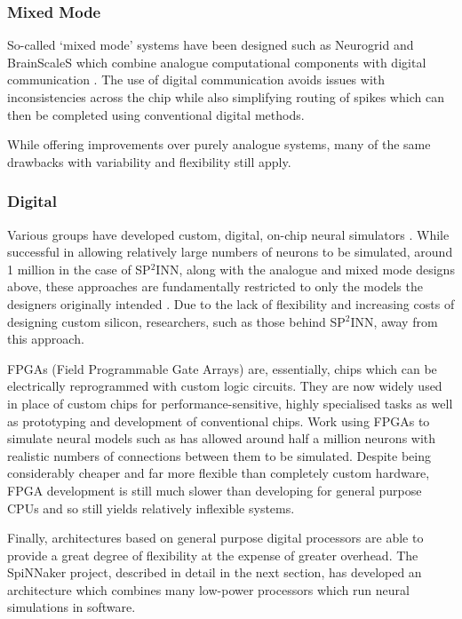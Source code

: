 			\subsubsection{Mixed Mode}
				
				So-called `mixed mode' systems have been designed such as Neurogrid and
				BrainScaleS which combine analogue computational components with digital
				communication \cite{choudhary12,maguire07}. The use of digital
				communication avoids issues with inconsistencies across the chip while
				also simplifying routing of spikes which can then be completed using
				conventional digital methods.
				
				While offering improvements over purely analogue systems, many of the same
				drawbacks with variability and flexibility still apply.
			
			\subsubsection{Digital}
				
				Various groups have developed custom, digital, on-chip neural simulators
				\cite{prange93,jahnke96,schoenauer99,mehrtash03}. While successful in
				allowing relatively large numbers of neurons to be simulated, around 1
				million in the case of SP$^2$INN, along with the analogue and mixed mode
				designs above, these approaches are fundamentally restricted to only the
				models the designers originally intended \cite{mehrtash03}. Due to the
				lack of flexibility and increasing costs of designing custom silicon,
				researchers, such as those behind SP$^2$INN, away from this approach.
				
				FPGAs (Field Programmable Gate Arrays) are, essentially, chips which can
				be electrically reprogrammed with custom logic circuits. They are now
				widely used in place of custom chips for performance-sensitive, highly
				specialised tasks as well as prototyping and development of conventional
				chips. Work using FPGAs to simulate neural models such as
				\cite{hellmich05} has allowed around half a million neurons with realistic
				numbers of connections between them to be simulated. Despite being
				considerably cheaper and far more flexible than completely custom
				hardware, FPGA development is still much slower than developing for
				general purpose CPUs and so still yields relatively inflexible systems.
				
				Finally, architectures based on general purpose digital processors are
				able to provide a great degree of flexibility at the expense of greater
				overhead\cite{furber07}. The SpiNNaker project, described in detail in the
				next section, has developed an architecture which combines many low-power
				processors which run neural simulations in software.
		
